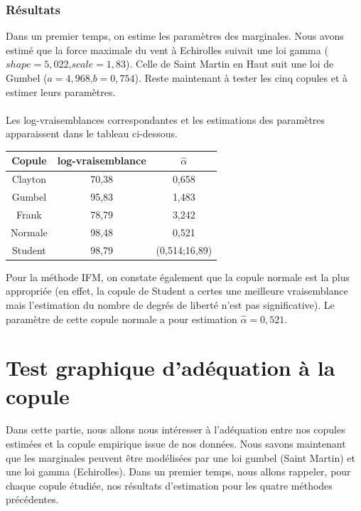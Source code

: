 \subsubsection{Résultats}

Dans un premier temps, on estime les paramètres des marginales. Nous avons estimé que la force maximale du vent à Echirolles suivait une loi gamma ($shape=5,022$,$scale=1,83$). Celle de Saint Martin en Haut suit une loi de Gumbel ($a =4,968$,$b = 0,754$). Reste maintenant à tester les cinq copules et à estimer leurs paramètres.
\\ \\
 Les log-vraisemblances correspondantes et les estimations des paramètres apparaissent dans le tableau ci-dessous.

\begin{center}
\begin{tabular}{|c|c|c|}
\hline 
Copule & log-vraisemblance &  $\hat{\alpha}$ \\
\hline
Clayton & 70,38 & 0,658 \\
\hline
Gumbel & 95,83 & 1,483 \\
\hline
Frank & 78,79 & 3,242 \\
\hline
Normale &  98,48 & 0,521 \\
\hline
Student & 98,79 & (0,514;16,89)  \\
\hline
\end{tabular}
\end{center}

Pour la méthode IFM, on constate également que la copule normale est la plus appropriée (en effet, la copule de Student a certes une meilleure vraisemblance mais l'estimation du nombre de degrés de liberté n'est pas significative). Le paramètre de cette copule normale a pour estimation $\hat{\alpha}=0,521$.

\section{Test graphique d'adéquation à la copule}

Dans cette partie, nous allons nous intéresser à l'adéquation entre nos copules estimées et la copule empirique issue de nos données. Nous savons maintenant que les marginales peuvent être modélisées par une loi gumbel (Saint Martin) et une loi gamma (Echirolles). Dans un premier temps, nous allons rappeler, pour chaque copule étudiée, nos résultats d'estimation pour les quatre méthodes précédentes. 

